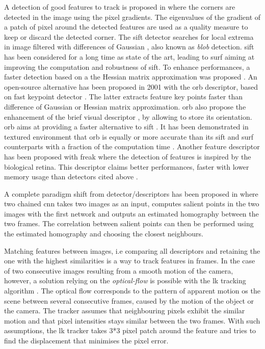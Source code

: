 A detection of good features to track is proposed in \cite{shi1994good} where the corners are detected in the image using the pixel gradients. The eigenvalues of the gradient of a patch of pixel around the detected features are used as a quality measure to keep or discard the detected corner. The \gls{sift} detector searches for local extrema in image filtered with differences of Gaussian \cite{lowe_object_1999}, also known as \emph{blob} detection. \gls{sift} has been considered for a long time as state of the art, leading to \gls{surf} aiming at improving the computation and robustness of \gls{sift}. To enhance performances, a faster detection based on a the Hessian matrix approximation was proposed \citep{leonardis_surf:_2006}. An open-source alternative has been proposed in 2001 with the \gls{orb} descriptor, based on \gls{fast} keypoint detector \citep{leonardis_machine_2006}. The latter extracts feature key points faster than difference of Gaussian or Hessian matrix approximation. \gls{orb} also propose the enhancement of the \gls{brief} visual descriptor \cite{hutchison_brief:_2010}, by allowing to store its orientation. \gls{orb} aims at providing a faster alternative to \gls{sift} \cite{rublee_orb:_2011}. It has been demonstrated in textured environment that \gls{orb} is equally or more accurate than  its \gls{sift} and \gls{surf} counterparts with a fraction of the computation time \cite{karami_image_2017}. Another feature descriptor has been proposed with \gls{freak} where the detection of features is inspired by the biological retina. This descriptor claims better performances, faster with lower memory usage than detectors cited above \cite{alahi_freak:_2012}. 

A complete paradigm shift from detector/descriptors has been proposed in \cite{detone_toward_2017} where two chained \gls{cnn} takes two images as an input, computes salient points in the two images with the first network and outputs an estimated homography between the two frames. The correlation between salient points can then be performed using the estimated homography and choosing the closest neighbours.

Matching features between images, i.e comparing all descriptors and retaining the one with the highest similarities is a way to track features in frames. In the case of two consecutive images resulting from a smooth motion of the camera, however, a solution relying on the \emph{optical-flow} is possible with the \gls{lk} tracking algorithm \cite{bourget_pyramidal_1999}. The optical flow corresponds to the pattern of apparent motion os the scene between several consecutive frames, caused by the motion of the object or the camera. The tracker assumes that neighbouring pixels exhibit the similar motion and that pixel intensities stays similar between the two frames. With such assumptions, the \gls{lk} tracker takes 3*3 pixel patch around the feature and tries to find the displacement that minimises the pixel error.

